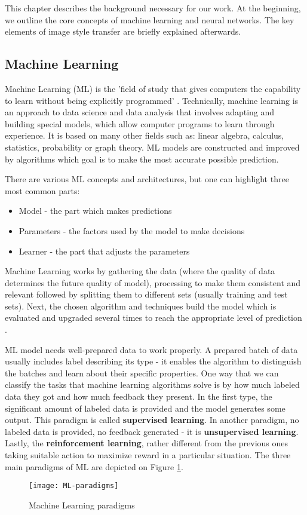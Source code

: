 \documentclass[../Main.tex]{subfiles}
\begin{document}
    This chapter describes the background necessary for our work. At the beginning, we outline the core concepts of machine learning and neural networks. The key elements of image style transfer are briefly explained afterwards.

\subsection{Machine Learning} 
    Machine Learning (ML) is the 'field of study that gives computers the capability to learn without being explicitly programmed' \cite{Samuel1959SomeSI}. Technically, machine learning is an approach to data science and data analysis that involves adapting and building special models, which allow computer programs to learn through experience. It is based on many other fields such as: linear algebra, calculus, statistics, probability or graph theory. ML models are constructed and improved by algorithms which goal is to make the most accurate possible prediction.
    
    There are various ML concepts and architectures, but one can highlight three most common parts:
    \begin{itemize}
        \item Model - the part which makes predictions
        \item Parameters - the factors used by the model to make decisions
        \item Learner - the part that adjusts the parameters
    \end{itemize}
    Machine Learning works by gathering the data (where the quality of data determines the future quality of model), processing to make them consistent and relevant followed by splitting them to different sets (usually training and test sets). Next, the chosen algorithm and techniques build the model which is evaluated and upgraded several times to reach the appropriate level of prediction \cite{deepai}.

    ML model needs well-prepared data to work properly. A prepared batch of data usually includes  label describing its type - it enables the algorithm to distinguish the batches and learn about their specific properties. One way that we can classify the tasks that machine learning algorithms solve is by how much labeled data they got and how much feedback they present. In the first type, the significant amount of labeled data is provided and the model generates some output. This paradigm is called \textbf{supervised learning}. In another paradigm, no labeled data is provided, no feedback generated - it is  \textbf{unsupervised learning}. Lastly, the \textbf{reinforcement learning}, rather different from the previous ones taking suitable action to maximize reward in a particular situation. The three main paradigms of ML are depicted on Figure \ref{fig:ML-paradigms}. \\
    \begin{figure}[h]
        \centering
        \texttt{[image: ML-paradigms]}
        \caption{Machine Learning paradigms}
        \label{fig:ML-paradigms}
    \end{figure}
\end{document}
